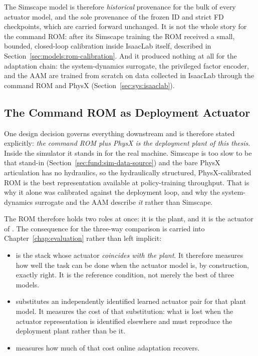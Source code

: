The Simscape model is therefore \emph{historical} provenance for the
bulk of every actuator model, and the sole provenance of the frozen ID
and strict FD checkpoints, which are carried forward unchanged. It is
not the whole story for the command ROM: after its Simscape training the
ROM received a small, bounded, closed-loop calibration inside IsaacLab
itself, described in Section~\ref{sec:models:rom-calibration}. And it
produced nothing at all for the adaptation chain: the system-dynamics
surrogate, the privileged factor encoder, and the AAM are trained from
scratch on data collected in IsaacLab through the command ROM and PhysX
(Section~\ref{sec:sys:isaaclab}).

\subsection{The Command ROM as Deployment Actuator}
\label{sec:sys:rom-is-plant}

One design decision governs everything downstream and is therefore stated
explicitly: \emph{the command ROM plus PhysX is the deployment plant of this
thesis}. Inside the simulator it stands in for the real machine. Simscape is
too slow to be that stand-in (Section~\ref{sec:fund:sim-data-source}) and the
bare PhysX articulation has no hydraulics, so the hydraulically structured,
PhysX-calibrated ROM is the best representation available at policy-training
throughput. That is why it alone was calibrated against the deployment loop,
and why the system-dynamics surrogate and the AAM describe \emph{it} rather
than Simscape.

The ROM therefore holds two roles at once: it is the plant, and it is the
actuator of \ppoROM. The consequence for the three-way comparison is carried
into Chapter~\ref{chap:evaluation} rather than left implicit:

\begin{itemize}
  \item \ppoROM{} is the stack whose actuator \emph{coincides with the
    plant}. It therefore measures how well the task can be done when the
    actuator model is, by construction, exactly right. It is the
    reference condition, not merely the best of three models.
  \item \ppoIDFD{} substitutes an independently identified learned
    actuator pair for that plant model. It measures the cost of that substitution: what is lost when the actuator representation is
    identified elsewhere and must reproduce the deployment plant rather
    than be it.
  \item \ppoIDAAMFD{} measures how much of that cost online adaptation
    recovers.
\end{itemize}

